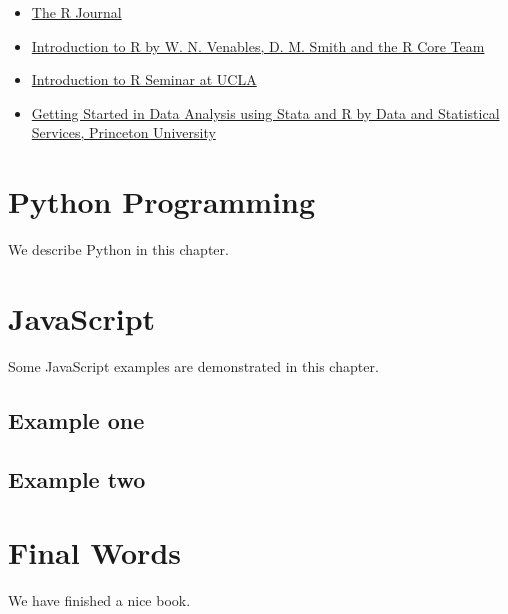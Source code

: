 \documentclass[]{book}
\providecommand{\tightlist}{%
  \setlength{\itemsep}{0pt}\setlength{\parskip}{0pt}}
\begin{document}
\begin{itemize}
\tightlist
\item
  \href{http://journal.r-project.org/}{The R Journal}
\item
  \href{http://cran.r-project.org/doc/manuals/R-intro.pdf}{Introduction to R by W. N. Venables, D. M. Smith and the R Core Team}
\item
  \href{http://www.ats.ucla.edu/stat/r/seminars/intro.htm}{Introduction to R Seminar at UCLA}
\item
  \href{https://dss.princeton.edu/training/}{Getting Started in Data Analysis using Stata and R by Data and Statistical Services, Princeton University}
\end{itemize}

\hypertarget{python-programming}{%
\chapter{Python Programming}\label{python-programming}}

We describe Python in this chapter.

\hypertarget{javascript}{%
\chapter{JavaScript}\label{javascript}}

Some JavaScript examples are demonstrated in this chapter.

\hypertarget{example-one}{%
\section{Example one}\label{example-one}}

\hypertarget{example-two}{%
\section{Example two}\label{example-two}}

\hypertarget{final-words}{%
\chapter{Final Words}\label{final-words}}

We have finished a nice book.


\end{document}
